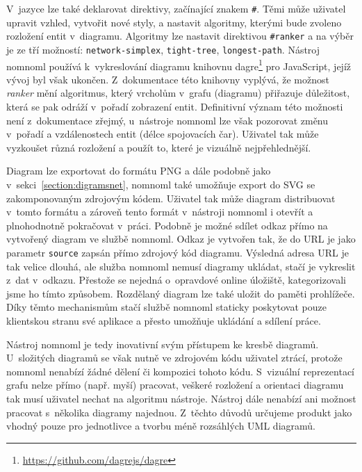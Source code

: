 V~jazyce lze také deklarovat direktivy, začínající znakem \texttt{\#}.
Těmi může uživatel upravit vzhled, vytvořit nové styly, a nastavit algoritmy, kterými bude zvoleno rozložení entit v~diagramu.
Algoritmy lze nastavit direktivou \texttt{\#ranker} a na výběr je ze tří možností: \texttt{network-simplex}, \texttt{tight-tree}, \texttt{longest-path}.
Nástroj nomnoml používá k~vykreslování diagramu knihovnu dagre\footnote{\url{https://github.com/dagrejs/dagre}} pro JavaScript, jejíž vývoj byl však ukončen.
Z~dokumentace této knihovny vyplývá, že možnost \emph{ranker} mění algoritmus, který vrcholům v~grafu (diagramu) přiřazuje důležitost, která se pak odráží v~pořadí zobrazení entit.
Definitivní význam této možnosti není z~dokumentace zřejmý, u~nástroje nomnoml lze však pozorovat změnu v~pořadí a vzdálenostech entit (délce spojovacích čar).
Uživatel tak může vyzkoušet různá rozložení a použít to, které je vizuálně nejpřehlednější.

Diagram lze exportovat do formátu PNG a dále podobně jako v~sekci~\ref{section:digramsnet}, nomnoml také umožňuje export do SVG se zakomponovaným zdrojovým kódem.
Uživatel tak může diagram distribuovat v~tomto formátu a zároveň tento formát v~nástroji nomnoml i otevřít a plnohodnotně pokračovat v~práci.
Podobně je možné sdílet odkaz přímo na vytvořený diagram ve službě nomnoml.
Odkaz je vytvořen tak, že do URL je jako parametr \texttt{source} zapsán přímo zdrojový kód diagramu.
Výsledná adresa URL je tak velice dlouhá, ale služba nomnoml nemusí diagramy ukládat, stačí je vykreslit z~dat v~odkazu.
Přestože se nejedná o~opravdové online úložiště, kategorizovali jsme ho tímto způsobem.
Rozdělaný diagram lze také uložit do paměti prohlížeče.
Díky těmto mechanismům stačí službě nomnoml staticky poskytovat pouze klientskou stranu své aplikace a přesto umožňuje ukládání a sdílení práce.

Nástroj nomnoml je tedy inovativní svým přístupem ke kresbě diagramů.
U~složitých diagramů se však nutně ve zdrojovém kódu uživatel ztrácí, protože nomnoml nenabízí žádné dělení či kompozici tohoto kódu.
S~vizuální reprezentací grafu nelze přímo (např. myší) pracovat, veškeré rozložení a orientaci diagramu tak musí uživatel nechat na algoritmu nástroje.
Nástroj dále nenabízí ani možnost pracovat s~několika diagramy najednou.
Z~těchto důvodů určujeme produkt jako vhodný pouze pro jednotlivce a tvorbu méně rozsáhlých UML diagramů.

